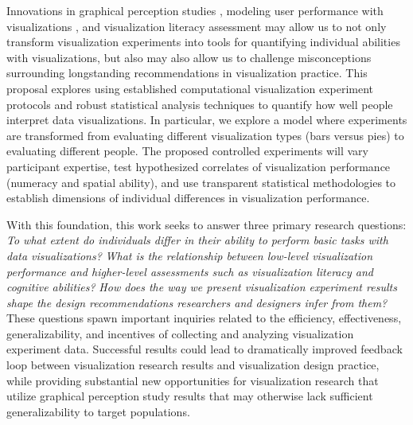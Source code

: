 \documentclass[11pt]{article}
\begin{document}
Innovations in graphical perception studies \cite{hullman2011impact, talbot2014four, harrison2013influencing, heer2010crowdsourcing, kong2010perceptual, simkin1987information, cleveland1984graphical, zacks1998reading, hofmann2012graphical, wickham2010graphical, majumder2013validation, zhao2013mind, vanderplas2016spatial, beecham2017map},
modeling user performance with visualizations \cite{rensink2016nature, rensink2016entropy, elliott2015interference, sher2017empirical, correll2017regression, gleicher2013perception, rensink2010perception, bobko1979perception, cleveland1982variables, pollack1960identification, meyer1997correlation, harrison2014ranking, kay2016beyond},
and visualization literacy assessment \cite{alper2017visualization, mcnamara2015bridging, mendez2017bottom, ruchikachorn2015learning, rushmeier2007revisiting, shah1999graphs, nelson2008clinical, carpenter1998model, kwon2016comparative, lee2017vlat, boy2014principled, baker2001toward, baker2004learning}
may allow us to not only transform visualization experiments into tools for quantifying individual abilities with visualizations, but also may also allow us to challenge misconceptions surrounding longstanding recommendations in visualization practice.
This proposal explores using established computational visualization experiment protocols and robust statistical analysis techniques to quantify how well people interpret data visualizations.
In particular, we explore a model where experiments are transformed from evaluating different visualization types (\eg bars versus pies) to evaluating different people.
The proposed controlled experiments will vary participant expertise, test hypothesized correlates of visualization performance (\eg numeracy and spatial ability), and use transparent statistical methodologies to establish dimensions of individual differences in visualization performance.

With this foundation, this work seeks to answer three primary research questions:
\emph{To what extent do individuals differ in their ability to perform basic tasks with data visualizations?}
\emph{What is the relationship between low-level visualization performance and higher-level assessments such as visualization literacy and cognitive abilities?}
\emph{How does the way we present visualization experiment results shape the design recommendations researchers and designers infer from them?}
These questions spawn important inquiries related to the efficiency, effectiveness, generalizability, and incentives of collecting and analyzing visualization experiment data.
Successful results could lead to dramatically improved feedback loop between visualization research results and visualization design practice, while providing substantial new opportunities for visualization research that utilize graphical perception study results that may otherwise lack sufficient generalizability to target populations.
\end{document}
